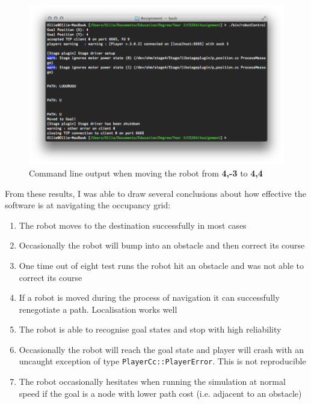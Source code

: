 \documentclass[a4paper,12pt]{article}
\begin{document}
\newpage
    \begin{figure}
        \begin{center}
            \includegraphics[scale=0.6]{images/Testing_CLI.png}
            \caption{Command line output when moving the robot from \textbf{4,-3} to \textbf{4,4}}
        \end{center}
\end{figure}

From these results, I was able to draw several conclusions about how effective the software is at navigating the occupancy grid:

\begin{enumerate}
    \item{The robot moves to the destination successfully in most cases}
    \item{Occasionally the robot will bump into an obstacle and then correct its course}
    \item{One time out of eight test runs the robot hit an obstacle and was not able to correct its course}
    \item{If a robot is moved during the process of navigation it can successfully renegotiate a path. Localisation works well}
    \item{The robot is able to recognise goal states and stop with high reliability}
    \item{Occasionally the robot will reach the goal state and player will crash with an uncaught exception of type \texttt{PlayerCc::PlayerError}. This is not reproducible}
    \item{The robot occasionally hesitates when running the simulation at normal speed if the goal is a node with lower path cost (i.e. adjacent to an obstacle)}
\end{enumerate}
\end{document}
